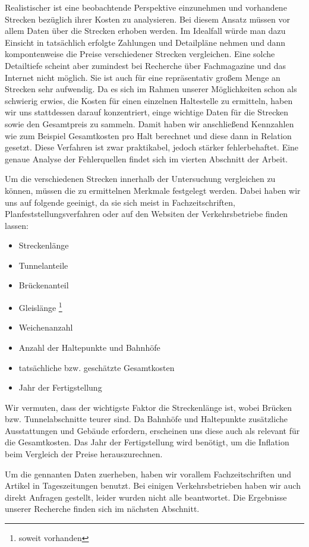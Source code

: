 Realistischer ist eine beobachtende Perspektive einzunehmen und vorhandene
Strecken bezüglich ihrer Kosten zu analysieren. Bei diesem Ansatz müssen vor
allem Daten über die Strecken erhoben werden. Im Idealfall würde man dazu
Einsicht in tatsächlich erfolgte Zahlungen und Detailpläne nehmen und dann
kompontenweise die Preise verschiedener Strecken vergleichen. Eine solche
Detailtiefe scheint aber zumindest bei Recherche über Fachmagazine und das
Internet nicht möglich. Sie ist auch für eine repräsentativ großem Menge an
Strecken sehr aufwendig. Da es sich im Rahmen unserer Möglichkeiten schon als
schwierig erwies, die Kosten für einen einzelnen Haltestelle zu ermitteln, haben
wir uns stattdessen darauf konzentriert, einge wichtige Daten für die Strecken
sowie den Gesamtpreis zu sammeln. Damit haben wir anschließend Kennzahlen wie
zum Beispiel Gesamtkosten pro Halt berechnet und diese dann in Relation
gesetzt. Diese Verfahren ist zwar praktikabel, jedoch stärker fehlerbehaftet. Eine
genaue Analyse der Fehlerquellen findet sich im vierten Abschnitt der Arbeit.

Um die verschiedenen Strecken innerhalb der Untersuchung vergleichen zu können,
müssen die zu ermittelnen Merkmale festgelegt werden. Dabei haben wir uns auf
folgende geeinigt, da sie sich meist in Fachzeitschriften,
Planfeststellungsverfahren oder auf den Websiten der Verkehrsbetriebe finden
lassen:

\begin{itemize}
\item Streckenlänge
\item Tunnelanteile
\item Brückenanteil
\item Gleislänge \footnote{soweit vorhanden}\setcounter{fnnumber}{\thefootnote}
\item Weichenanzahl \footnotemark[\thefnnumber]
\item Anzahl der Haltepunkte und Bahnhöfe
\item tatsächliche bzw. geschätzte Gesamtkosten
\item Jahr der Fertigstellung
\end{itemize}

Wir vermuten, dass der wichtigste Faktor die Streckenlänge ist, wobei Brücken
bzw. Tunnelabschnitte teurer sind. Da Bahnhöfe und Haltepunkte zusätzliche
Ausstattungen und Gebäude erfordern, erscheinen uns diese auch als relevant für
die Gesamtkosten. Das Jahr der Fertigstellung wird benötigt, um die Inflation
beim Vergleich der Preise herauszurechnen.

Um die gennanten Daten zuerheben, haben wir vorallem Fachzeitschriften und
Artikel in Tageszeitungen benutzt. Bei einigen Verkehrsbetrieben haben wir auch
direkt Anfragen gestellt, leider wurden nicht alle beantwortet. Die Ergebnisse
unserer Recherche finden sich im nächsten Abschnitt.
